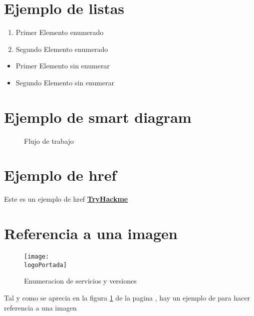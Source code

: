 \documentclass[a4paper]{article} %
\newcommand{\logoPortada}{~/.LaTexScript/THM/THMlogo.png}
\begin{document}
  \section{Ejemplo de listas} 

  \begin{enumerate}
    \item Primer Elemento enumerado
    \item Segundo Elemento enumerado
  \end{enumerate}


  \begin{itemize}
    \item Primer Elemento sin enumerar
    \item Segundo Elemento sin enumerar
  \end{itemize}


  \section{Ejemplo de smart diagram}


  \begin{figure}[h]
    \begin{center}
      \caption{Flujo de trabajo} 
    \end{center}
  \end{figure}

  \section{Ejemplo de href}

  Este es un ejemplo de href \href{https://tryhackme.com}{\textbf{\color{red}TryHackme}}


  \section{Referencia a una imagen}
 
  \begin{figure}[h]
  \centering
    \texttt{[image: \\logoPortada]}
    \caption{Enumeracion de servicios y versiones}
    \label{fig:servicesResults}

  \end{figure}

  \vspace{0.2cm}

  Tal y como se aprecia en la figura \ref{fig:servicesResults} de la pagina
  \pageref{fig:servicesResults}, hay un ejemplo de para hacer referencia a una
  imagen
 

  \clearpage
\end{document}
